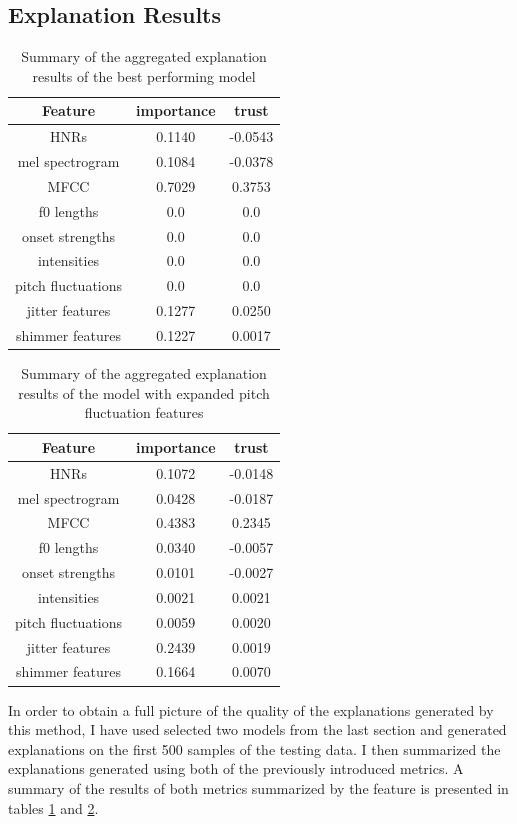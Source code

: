 \documentclass{article}
\begin{document}
		\subsection{Explanation Results}
		\begin{table}[htbp]
			\centering
			\begin{tabular}{c | c | c}
				Feature & importance & trust \\
				\hline
				HNRs & 0.1140 & -0.0543 \\
				mel spectrogram & 0.1084 & -0.0378 \\
				MFCC & 0.7029 & 0.3753 \\
				f0 lengths & 0.0 & 0.0 \\
				onset strengths & 0.0 & 0.0 \\
				intensities & 0.0 & 0.0 \\
				pitch fluctuations & 0.0 & 0.0 \\
				jitter features & 0.1277 & 0.0250 \\
				shimmer features & 0.1227 & 0.0017
			\end{tabular}
			\caption{Summary of the aggregated explanation results of the best performing model}
			\label{table:exp-results-cterm}
		\end{table}
		\begin{table}[htbp]
			\centering
			\begin{tabular}{c | c | c}
				Feature & importance & trust \\
				\hline
				HNRs & 0.1072 & -0.0148 \\
				mel spectrogram & 0.0428 & -0.0187 \\
				MFCC & 0.4383 & 0.2345 \\
				f0 lengths & 0.0340 & -0.0057 \\
				onset strengths & 0.0101 & -0.0027 \\
				intensities & 0.0021 & 0.0021 \\
				pitch fluctuations & 0.0059 & 0.0020 \\
				jitter features & 0.2439 & 0.0019 \\
				shimmer features & 0.1664 & 0.0070
			\end{tabular}
			\caption{Summary of the aggregated explanation results of the model with expanded
			pitch fluctuation features}
			\label{table:exp-results-more-pitch-flucs}
		\end{table}
		In order to obtain a full picture of the quality of the explanations generated by this
		method, I have used selected two models from the last section and generated explanations
		on the first 500 samples of the testing data. I then summarized the explanations generated
		using both of the previously introduced metrics. A summary of the results of both metrics
		summarized by the feature is presented in tables \ref{table:exp-results-cterm} and
		\ref{table:exp-results-more-pitch-flucs}. 
\end{document}
